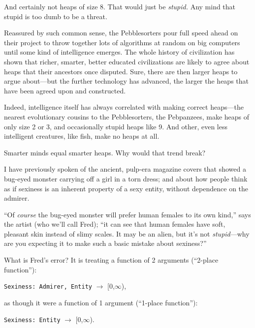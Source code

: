 {
 And certainly not heaps of size 8. That would just be
\textit{stupid.} Any mind that stupid is too dumb to be a threat.}

{
 Reassured by such common sense, the Pebblesorters pour full speed
ahead on their project to throw together lots of algorithms at random
on big computers until some kind of intelligence emerges. The whole
history of civilization has shown that richer, smarter, better educated
civilizations are likely to agree about heaps that their ancestors once
disputed. Sure, there are then larger heaps to argue about---but the
further technology has advanced, the larger the heaps that have been
agreed upon and constructed.}

{
 Indeed, intelligence itself has always correlated with making
correct heaps---the nearest evolutionary cousins to the Pebblesorters,
the Pebpanzees, make heaps of only size 2 or 3, and occasionally stupid
heaps like 9. And other, even less intelligent creatures, like fish,
make no heaps at all.}

{
 Smarter minds equal smarter heaps. Why would that trend break?}

\myendsectiontext


{
 I have previously spoken of the ancient, pulp-era magazine covers
that showed a bug-eyed monster carrying off a girl in a torn dress; and
about how people think as if sexiness is an inherent property of a sexy
entity, without dependence on the admirer. }

{
 ``Of \textit{course} the bug-eyed monster will
prefer human females to its own kind,'' says the
artist (who we'll call Fred); ``it can
see that human females have soft, pleasant skin instead of slimy
scales. It may be an alien, but it's not
\textit{stupid}{}---why are you expecting it to make such a basic
mistake about sexiness?''}

{
 What is Fred's error? It is treating a function of
2 arguments (``2-place function''):}

\begin{center}
 \texttt{Sexiness: Admirer, Entity} $\rightarrow $ [0,${\infty}$),
\end{center}


{
 as though it were a function of 1 argument
(``1-place function''):}

\begin{center}
 \texttt{Sexiness: Entity} $\rightarrow $ [0,${\infty}$).
\end{center}


